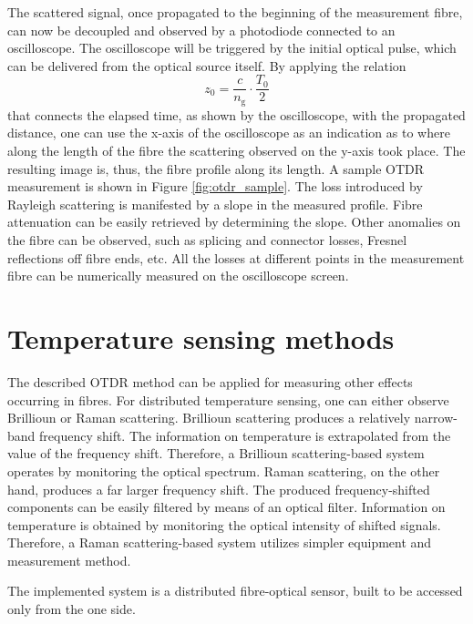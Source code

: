 \documentclass{standalone}
\begin{document}
The scattered signal, once propagated to the beginning of the measurement fibre, can now be decoupled and observed by a photodiode connected to an oscilloscope. The oscilloscope will be triggered by the initial optical pulse, which can be delivered from the optical source itself. By applying the relation 
\begin{equation} \label{eq:otdr_time_distance}
z_0 = \frac{c}{n_\textrm{g}} \cdot \frac{T_0}{2}
\end{equation}
that connects the elapsed time, as shown by the oscilloscope, with the propagated distance, one can use the x-axis of the oscilloscope as an indication as to where along the length of the fibre the scattering observed on the y-axis took place. The resulting image is, thus, the fibre profile along its length. A sample OTDR measurement is shown in Figure \ref{fig:otdr_sample}.
The loss introduced by Rayleigh scattering is manifested by a slope in the measured profile. Fibre attenuation can be easily retrieved by determining the slope. Other anomalies on the fibre can be observed, such as splicing and connector losses, Fresnel reflections off fibre ends, etc. All the losses at different points in the measurement fibre can be numerically measured on the oscilloscope screen.\\

\section{Temperature sensing methods}






The described OTDR method can be applied for measuring other effects occurring in fibres. For distributed temperature sensing, one can either observe Brillioun or Raman scattering. Brillioun scattering produces a relatively narrow-band frequency shift. The information on temperature is extrapolated from the value of the frequency shift. Therefore, a Brillioun scattering-based system operates by monitoring the optical spectrum. Raman scattering, on the other hand, produces a far larger frequency shift. The produced frequency-shifted components can be easily filtered by means of an optical filter. Information on temperature is obtained by monitoring the optical intensity of shifted signals. Therefore, a Raman scattering-based system utilizes simpler equipment and measurement method. 





The implemented system is a distributed fibre-optical sensor, built to be accessed only from the one side.



\setcounter{stranica}{\thepage}
\addtocounter{stranica}{1}
\end{document}
